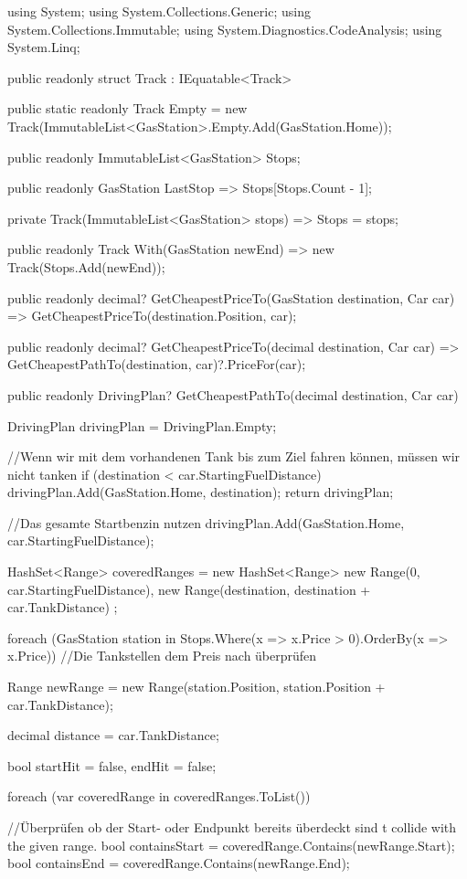 \documentclass[a4paper,10pt,ngerman]{scrartcl}
\begin{document}
\begin{lstcs}
using System;
using System.Collections.Generic;
using System.Collections.Immutable;
using System.Diagnostics.CodeAnalysis;
using System.Linq;

public readonly struct Track : IEquatable<Track>
{
    public static readonly Track Empty = new Track(ImmutableList<GasStation>.Empty.Add(GasStation.Home));

    public readonly ImmutableList<GasStation> Stops;

    public readonly GasStation LastStop => Stops[Stops.Count - 1];

    private Track(ImmutableList<GasStation> stops) => Stops = stops;

    public readonly Track With(GasStation newEnd) => new Track(Stops.Add(newEnd));

    public readonly decimal? GetCheapestPriceTo(GasStation destination, Car car) =>
        GetCheapestPriceTo(destination.Position, car);

    public readonly decimal? GetCheapestPriceTo(decimal destination, Car car) =>
        GetCheapestPathTo(destination, car)?.PriceFor(car);

    public readonly DrivingPlan? GetCheapestPathTo(decimal destination, Car car)
    {
        DrivingPlan drivingPlan = DrivingPlan.Empty;

        //Wenn wir mit dem vorhandenen Tank bis zum Ziel fahren können, müssen wir nicht tanken
        if (destination < car.StartingFuelDistance)
        {
            drivingPlan.Add(GasStation.Home, destination);
            return drivingPlan;
        }

        //Das gesamte Startbenzin nutzen
        drivingPlan.Add(GasStation.Home, car.StartingFuelDistance);

        HashSet<Range> coveredRanges = new HashSet<Range>
        {
            new Range(0, car.StartingFuelDistance),
            new Range(destination, destination + car.TankDistance)
        };

        foreach (GasStation station in Stops.Where(x => x.Price > 0).OrderBy(x => x.Price)) //Die Tankstellen dem Preis nach überprüfen
        {
            Range newRange = new Range(station.Position, station.Position + car.TankDistance);

            decimal distance = car.TankDistance;

            bool startHit = false, endHit = false;

            foreach (var coveredRange in coveredRanges.ToList())
            {
                //Überprüfen ob der Start- oder Endpunkt bereits überdeckt sind                                                                                                                                                t collide with the given range.
                bool containsStart = coveredRange.Contains(newRange.Start);
                bool containsEnd = coveredRange.Contains(newRange.End);

}}}}
\end{lstcs}
\end{document}
